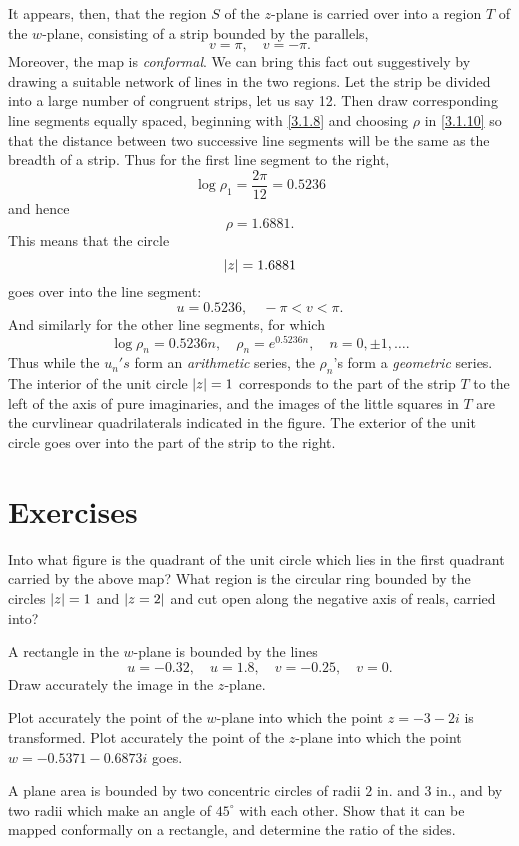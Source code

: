 \documentclass[twosided]{memoir}
\begin{document}
It appears, then, that the region $S$ of the $z$-plane is carried over into a region $T$ of the $w$-plane, consisting of a strip bounded by the parallels,
\begin{equation}\label{3.1.11}
v=\pi ,\quad v=-\pi. 
\end{equation}
Moreover, the map is \emph{conformal}. We can bring this fact out suggestively by drawing a suitable network of lines in the two regions. Let the strip be divided into a large number of congruent strips, let us say 12. Then draw corresponding line segments equally spaced, beginning with \ref{3.1.8} and choosing $\rho $ in \ref{3.1.10} so that the distance between two successive line segments will be the same as the breadth of a strip. Thus for the first line segment to the right,
\[
\log \rho_1=\frac{2\pi }{12} =0.5236
\] and hence
\[
\rho =1.6881
.\] This means that the circle 
\[
\abs*{z} =1.6881
\] goes over into the line segment:
\[
u=0.5236, \quad -\pi <v<\pi 
.\] And similarly for the other line segments, for which
\[
\log \rho_n=0.5236n, \quad \rho _n=e^{0.5236n}, \quad n=0, \pm 1, \dots 
.\] Thus while the $u_n's$ form an \emph{arithmetic} series, the $\rho _n$'s form a \emph{geometric} series. The interior of the unit circle $\abs*{z} =1$ corresponds to the part of the strip $T$ to the left of the axis of pure imaginaries, and the images of the little squares in $T$ are the curvlinear quadrilaterals indicated in the figure. The exterior of the unit circle goes over into the part of the strip to the right.
\section*{Exercises}
\problem Into what figure is the quadrant of the unit circle which lies in the first quadrant carried by the above map?
\problem What region is the circular ring bounded by the circles $\abs*{z} =1$ and $\abs*{z=2} $ and cut open along the negative axis of reals, carried into?

\problem A rectangle in the $w$-plane is bounded by the lines
\[
u=-0.32,\quad u=1.8, \quad v=-0.25,\quad v=0
.\] Draw accurately the image in the $z$-plane.

\problem Plot accurately the point of the $w $-plane into which the point $z=-3-2i$ is transformed.
\problem Plot accurately the point of the $z$-plane into which the point $w=-0.5371-0.6873i$ goes.

\problem A plane area is bounded by two concentric circles of radii $2$ in. and $3$ in., and by two radii which make an angle of $45^\circ$ with each other. Show that it can be mapped conformally on a rectangle, and determine the ratio of the sides.
\end{document}
